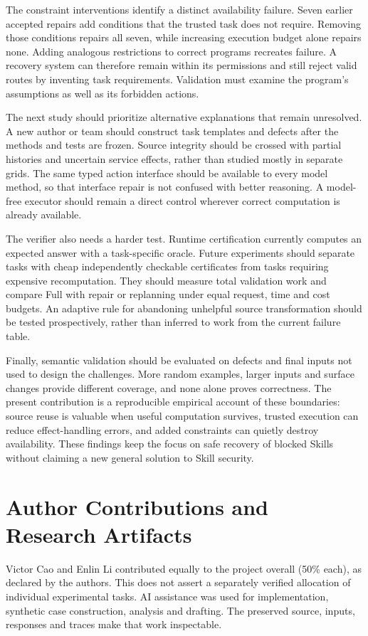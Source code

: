 \documentclass[conference]{IEEEtran}
\begin{document}
The constraint interventions identify a distinct availability failure. Seven earlier accepted repairs add conditions that the trusted task does not require. Removing those conditions repairs all seven, while increasing execution budget alone repairs none. Adding analogous restrictions to correct programs recreates failure. A recovery system can therefore remain within its permissions and still reject valid routes by inventing task requirements. Validation must examine the program's assumptions as well as its forbidden actions.

The next study should prioritize alternative explanations that remain unresolved. A new author or team should construct task templates and defects after the methods and tests are frozen. Source integrity should be crossed with partial histories and uncertain service effects, rather than studied mostly in separate grids. The same typed action interface should be available to every model method, so that interface repair is not confused with better reasoning. A model-free executor should remain a direct control wherever correct computation is already available.

The verifier also needs a harder test. Runtime certification currently computes an expected answer with a task-specific oracle. Future experiments should separate tasks with cheap independently checkable certificates from tasks requiring expensive recomputation. They should measure total validation work and compare Full with repair or replanning under equal request, time and cost budgets. An adaptive rule for abandoning unhelpful source transformation should be tested prospectively, rather than inferred to work from the current failure table.

Finally, semantic validation should be evaluated on defects and final inputs not used to design the challenges. More random examples, larger inputs and surface changes provide different coverage, and none alone proves correctness. The present contribution is a reproducible empirical account of these boundaries: source reuse is valuable when useful computation survives, trusted execution can reduce effect-handling errors, and added constraints can quietly destroy availability. These findings keep the focus on safe recovery of blocked Skills without claiming a new general solution to Skill security.

\section*{Author Contributions and Research Artifacts}
Victor Cao and Enlin Li contributed equally to the project overall (50\% each), as declared by the authors. This does not assert a separately verified allocation of individual experimental tasks. AI assistance was used for implementation, synthetic case construction, analysis and drafting. The preserved source, inputs, responses and traces make that work inspectable.
\end{document}
